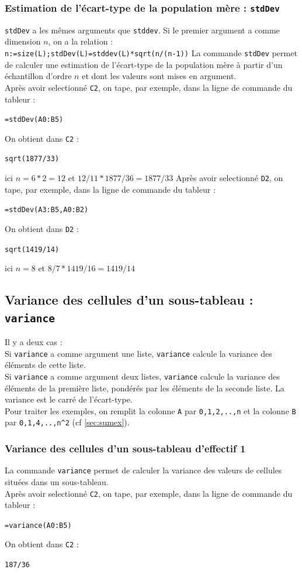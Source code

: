 \documentclass[a4paper,11pt]{book}
\begin{document}
\subsubsection{Estimation de l'\'ecart-type de la population m\`ere : {\tt stdDev}}\label{stdDev}
 {\tt stdDev} a les m\^emes arguments que {\tt stddev}.
Si le premier argument a comme dimension $n$, on a la relation :\\
{\tt n:=size(L);stdDev(L)=stddev(L)*sqrt(n/(n-1))}
La commande {\tt stdDev} permet de calculer une estimation de l'\'ecart-type de
 la population m\`ere \`a partir d'un \'echantillon d'ordre $n$ et dont les 
valeurs sont mises en argument.\\ 
Apr\`es avoir selectionn\'e {\tt C2}, on tape, par exemple, dans la ligne de 
commande du tableur :
\begin{center}{\tt =stdDev(A0:B5)}\end{center}
On obtient dans {\tt C2} :
\begin{center}{\tt sqrt(1877/33) }\end{center}
ici $n=6*2=12$ et $12/11*1877/36=1877/33$ 
Apr\`es avoir selectionn\'e {\tt D2}, on tape, par exemple, dans la ligne de 
commande du tableur :
\begin{center}{\tt =stdDev(A3:B5,A0:B2)}\end{center}
On obtient dans {\tt D2} :
\begin{center}{\tt sqrt(1419/14)}\end{center}
ici $n=8$ et $8/7*1419/16=1419/14$
\subsection{Variance des cellules d'un sous-tableau : {\tt variance}}\label{sec:variance}
Il y a deux cas :\\
Si {\tt variance} a comme argument une liste, {\tt variance} calcule la 
variance des \'el\'ements de cette liste.\\
Si {\tt variance} a comme argument deux listes, {\tt variance} calcule 
la variance des \'el\'ements de la premi\`ere liste, pond\'er\'es par les 
\'el\'ements de la seconde liste. La variance est le carr\'e de 
l'\'ecart-type.\\
Pour traiter les exemples,  on remplit la colonne {\tt A} par 
{\tt 0,1,2,..,n} et la colonne 
{\tt B} par {\tt 0,1,4,..,n\verb|^|2} (cf \ref{sec:sumex}). 
\subsubsection{Variance des cellules d'un sous-tableau d'effectif 1}
La commande {\tt variance} permet de calculer la variance des valeurs de
cellules situ\'ees dans un sous-tableau.\\ 
Apr\`es avoir selectionn\'e {\tt C2}, on tape, par exemple, dans la ligne de 
commande du tableur :
\begin{center}{\tt =variance(A0:B5)}\end{center}
On obtient dans {\tt C2} :
\begin{center}{\tt 187/36}\end{center}
\end{document}
